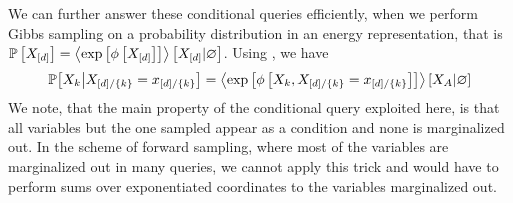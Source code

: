 We can further answer these conditional queries efficiently, when we perform Gibbs sampling on a probability distribution in an energy representation, that is $\mathbb{P}\left[X_{[d]}\right]=\left\langle \mathrm{exp}\left[\phi\left[X_{[d]}\right]\right]\right\rangle \left[ X_{[d]} | \varnothing \right]$.
Using , we have
\begin{align*}
    \mathbb{P}\big[X_{k}\big|X_{[d]/\{k\}}=x_{[d]/\{k\}}\big]
    = \left\langle \mathrm{exp}\left[\phi\left[X_{k},X_{[d]/\{k\}}=x_{[d]/\{k\}}\right]\right]
    \right\rangle \left[ X_{A} | \varnothing \right]
\end{align*}
We note, that the main property of the conditional query exploited here, is that all variables but the one sampled appear as a condition and none is marginalized out.
In the scheme of forward sampling, where most of the variables are marginalized out in many queries, we cannot apply this trick and would have to perform sums over exponentiated coordinates to the variables marginalized out.


\label{sec:simulatedAnnealing}

